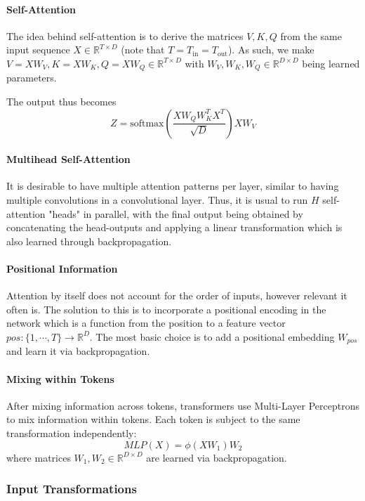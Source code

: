 \documentclass{article}
\newcommand{\R}{\mathbb{R}}
\begin{document}
\paragraph{Self-Attention}

The idea behind self-attention is to derive the matrices $V, K, Q$ from the same input sequence $X \in \R^{T \times D}$ (note that $T = T_\text{in} = T_\text{out}$).
As such, we make $V = XW_V, K = XW_K, Q = XW_Q \in \R^{T \times D}$ with $W_V, W_K, W_Q \in \R^{D \times D}$ being learned parameters.

The output thus becomes
$$
Z = \text{softmax} \left( \frac{X W_Q W_K^T X^T}{\sqrt{D}} \right) X W_V
$$

\paragraph{Multihead Self-Attention}

It is desirable to have multiple attention patterns per layer, similar to having multiple convolutions in a convolutional layer.
Thus, it is usual to run $H$ self-attention "heads" in parallel, with the final output being obtained by concatenating the head-outputs and applying a linear transformation which is also learned through backpropagation.

\paragraph{Positional Information}

Attention by itself does not account for the order of inputs, however relevant it often is.
The solution to this is to incorporate a positional encoding in the network which is a function from the position to a feature vector $pos : \{1, \cdots , T\} \to \R^D$.
The most basic choice is to add a positional embedding $W_{pos}$ and learn it via backpropagation.

\paragraph{Mixing within Tokens}

After mixing information across tokens, transformers use Multi-Layer Perceptrons to mix information within tokens.
Each token is subject to the same transformation independently:
$$
MLP(X) = \phi(X W_1) W_2
$$
where matrices $W_1, W_2 \in \R^{D \times D}$ are learned via backpropagation.

\subsubsection{Input Transformations}
\end{document}
